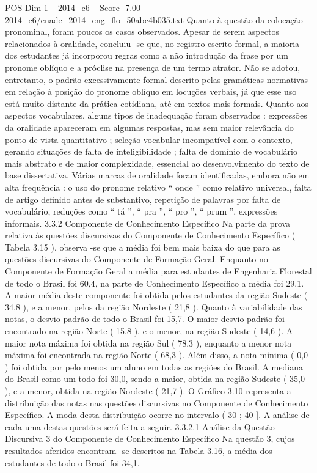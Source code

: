 \begin{textsample}{POS Dim 1 – 2014\_c6 – Score -7.00 – 2014\_c6/enade\_2014\_eng\_flo\_50abc4b035.txt}
Quanto à questão da colocação pronominal, foram poucos os casos observados.
Apesar de serem aspectos relacionados à oralidade, concluiu -se que, no registro escrito formal, a maioria dos estudantes já incorporou regras como a não introdução da frase por um pronome oblíquo e a próclise na presença de um termo atrator.
Não se adotou, entretanto, o padrão excessivamente formal descrito pelas gramáticas normativas em relação à posição do pronome oblíquo em locuções verbais, já que esse uso está muito distante da prática cotidiana, até em textos mais formais.
Quanto aos aspectos vocabulares, alguns tipos de inadequação foram observados : expressões da oralidade apareceram em algumas respostas, mas sem maior relevância do ponto de vista quantitativo ; seleção vocabular incompatível com o contexto, gerando situações de falta de inteligibilidade ; falta de domínio de vocabulário mais abstrato e de maior complexidade, essencial ao desenvolvimento do texto de base dissertativa.
Várias marcas de oralidade foram identificadas, embora não em alta frequência : o uso do pronome relativo “ onde ” como relativo universal, falta de artigo definido antes de substantivo, repetição de palavras por falta de vocabulário, reduções como “ tá ”, “ pra ”, “ pro ”, “ prum ”, expressões informais. 3.3.2 Componente de Conhecimento Específico Na parte da prova relativa às questões discursivas do Componente de Conhecimento Específico ( Tabela 3.15 ), observa -se que a média foi bem mais baixa do que para as questões discursivas do Componente de Formação Geral.
Enquanto no Componente de Formação Geral a média para estudantes de Engenharia Florestal de todo o Brasil foi 60,4, na parte de Conhecimento Específico a média foi 29,1.
A maior média deste componente foi obtida pelos estudantes da região Sudeste ( 34,8 ), e a menor, pelos da região Nordeste ( 21,8 ).
Quanto à variabilidade das notas, o desvio padrão de todo o Brasil foi 15,7.
O maior desvio padrão foi encontrado na região Norte ( 15,8 ), e o menor, na região Sudeste ( 14,6 ).
A maior nota máxima foi obtida na região Sul ( 78,3 ), enquanto a menor nota máxima foi encontrada na região Norte ( 68,3 ).
Além disso, a nota mínima ( 0,0 ) foi obtida por pelo menos um aluno em todas as regiões do Brasil.
A mediana do Brasil como um todo foi 30,0, sendo a maior, obtida na região Sudeste ( 35,0 ), e a menor, obtida na região Nordeste ( 21,7 ).
O Gráfico 3.10 representa a distribuição das notas nas questões discursivas no Componente de Conhecimento Específico.
A moda desta distribuição ocorre no intervalo ( 30 ; 40 ].
A análise de cada uma destas questões será feita a seguir. 3.3.2.1 Análise da Questão Discursiva 3 do Componente de Conhecimento Específico Na questão 3, cujos resultados aferidos encontram -se descritos na Tabela 3.16, a média dos estudantes de todo o Brasil foi 34,1.

\end{textsample}
